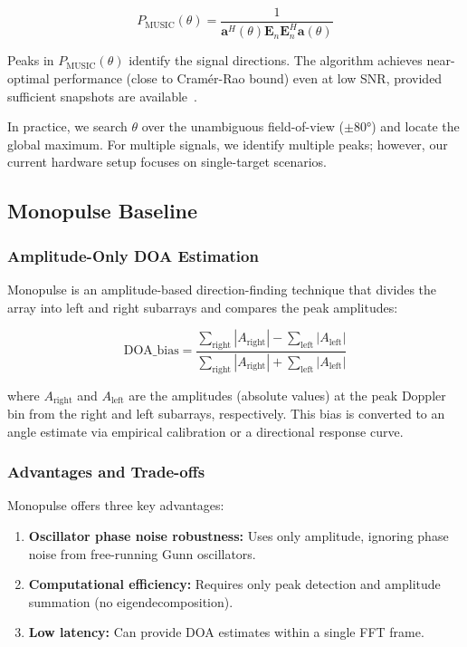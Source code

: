 \documentclass[10pt,a4paper]{article}
\begin{document}
\begin{equation}
P_{\text{MUSIC}}(\theta) = \frac{1}{\mathbf{a}^H(\theta) \mathbf{E}_n \mathbf{E}_n^H \mathbf{a}(\theta)}
\label{eq:music_pseudo}
\end{equation}

Peaks in $P_{\text{MUSIC}}(\theta)$ identify the signal directions. The algorithm achieves near-optimal
performance (close to Cramér-Rao bound) even at low SNR, provided sufficient snapshots are available~\cite{Schmidt1986}.

In practice, we search $\theta$ over the unambiguous field-of-view ($\pm 80°$) and locate the global maximum.
For multiple signals, we identify multiple peaks; however, our current hardware setup focuses on single-target
scenarios.

\subsection{Monopulse Baseline}

\subsubsection{Amplitude-Only DOA Estimation}

Monopulse is an amplitude-based direction-finding technique that divides the array into
left and right subarrays and compares the peak amplitudes:

\begin{equation}
\text{DOA\_bias} = \frac{\sum_{\text{right}} |A_{\text{right}}| - \sum_{\text{left}} |A_{\text{left}}|}{\sum_{\text{right}} |A_{\text{right}}| + \sum_{\text{left}} |A_{\text{left}}|}
\label{eq:monopulse}
\end{equation}

where $A_{\text{right}}$ and $A_{\text{left}}$ are the amplitudes (absolute values) at the peak Doppler bin
from the right and left subarrays, respectively. This bias is converted to an angle estimate via
empirical calibration or a directional response curve.

\subsubsection{Advantages and Trade-offs}

Monopulse offers three key advantages:

\begin{enumerate}
\item \textbf{Oscillator phase noise robustness:} Uses only amplitude, ignoring phase noise from free-running Gunn oscillators.
\item \textbf{Computational efficiency:} Requires only peak detection and amplitude summation (no eigendecomposition).
\item \textbf{Low latency:} Can provide DOA estimates within a single FFT frame.
\end{enumerate}
\end{document}
